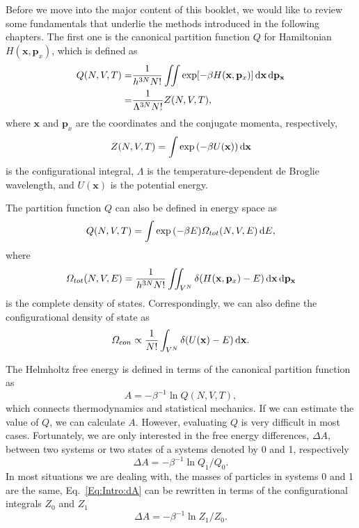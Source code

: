 Before we move into the major content of this booklet, we would like to review some fundamentals that underlie the methods introduced in the following chapters. The first one is the canonical partition function $Q$ for Hamiltonian $H(\mathbf{x},\mathbf{p}_{x})$, which is defined as
\begin{align}
  Q(N,V,T)=&\frac{1}{{h}^{3N}N!} \iint \exp[-\beta H(\mathbf{x},\mathbf{p}_{x})] \mathop{}\!\mathrm{d}\mathbf{x}\mathop{}\!\mathrm{d}\mathbf{p}_\mathbf{x}\notag\\
         =&\frac{1}{\Lambda^{3N}N!}Z(N,V,T),
\end{align}
where $\mathbf{x}$ and $\mathbf{p}_{x}$ are the coordinates and the conjugate momenta, respectively,
\begin{equation}
	Z(N,V,T)=\int \exp{\left(-\beta U(\mathbf{x})\right)}\mathop{}\!\mathrm{d}\mathbf{x}
\end{equation}
is the configurational integral, $\Lambda$ is the temperature-dependent de Broglie wavelength, and $U(\mathbf{x})$ is the potential energy.

The partition function $Q$ can also be defined in energy space as
\begin{equation}
	Q(N,V,T)=\int \exp{\left(-\beta E\right)}\varOmega_{tot}(N,V,E)\mathop{}\!\mathrm{d} E,
\end{equation}
where
\begin{equation}
	\varOmega_{tot}(N,V,E)=\frac{1}{{h}^{3N}N!}\iint_{V^N} \delta(H(\mathbf{x},\mathbf{p}_{x})-E)\mathop{}\!\mathrm{d}\mathbf{x}\mathop{}\!\mathrm{d}\mathbf{p}_\mathbf{x}
\end{equation}
is the complete density of states. Correspondingly, we can also define the configurational density of state as
\begin{equation}
	\varOmega_{con}\propto\frac{1}{N!}\int_{V^N} \delta(U(\mathbf{x})-E)\mathop{}\!\mathrm{d}\mathbf{x}.
\end{equation}

The Helmholtz free energy is defined in terms of the canonical partition function as
\begin{equation}
A=-\beta^{-1}\ln{Q(N,V,T)},
\end{equation}
which connects thermodynamics and statistical mechanics. If we can estimate the value of $Q$, we can calculate $A$. However, evaluating $Q$ is very difficult in most cases. Fortunately, we are only interested in the free energy differences, $\Delta A$, between two systems or two states of a systems denoted by 0 and 1, respectively
\begin{equation}
\Delta A=-\beta^{-1}\ln{Q_1/Q_0}.
\label{Eq:Intro:dA}
\end{equation}
In most situations we are dealing with, the masses of particles in systems 0 and 1 are the same, Eq.~\ref{Eq:Intro:dA} can be rewritten in terms of the configurational integrals $Z_0$ and $Z_1$
\begin{equation}
\Delta A=-\beta^{-1}\ln{Z_1/Z_0}.
\end{equation}

